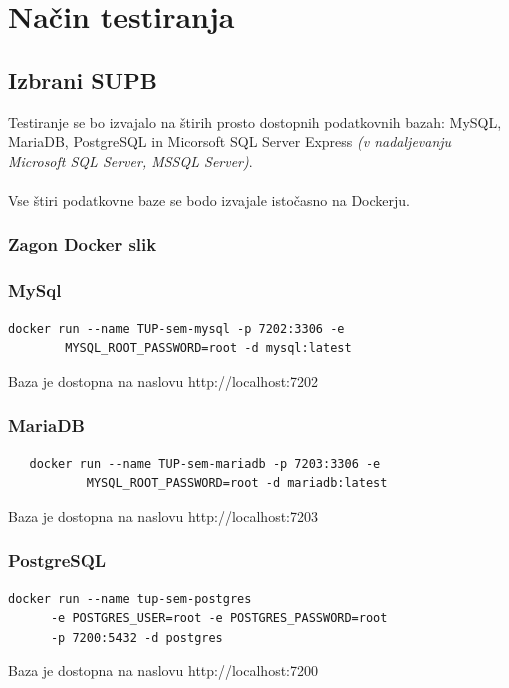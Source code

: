 \documentclass[a4paper,11pt]{report}
\begin{document}
\chapter{Način testiranja}
\section{Izbrani SUPB}
Testiranje se bo izvajalo na štirih prosto dostopnih podatkovnih bazah: MySQL, MariaDB, PostgreSQL in Micorsoft SQL Server Express \textit{(v nadaljevanju Microsoft SQL Server, MSSQL Server)}.
\\\\
Vse štiri podatkovne baze se bodo izvajale istočasno na Dockerju.

\subsection{Zagon Docker slik}

\subsection{MySql}
\begin{lstlisting}
docker run --name TUP-sem-mysql -p 7202:3306 -e 
        MYSQL_ROOT_PASSWORD=root -d mysql:latest
\end{lstlisting}

Baza je dostopna na naslovu http://localhost:7202

\subsection{MariaDB}
\begin{lstlisting}
   docker run --name TUP-sem-mariadb -p 7203:3306 -e 
           MYSQL_ROOT_PASSWORD=root -d mariadb:latest
   \end{lstlisting}
   
   Baza je dostopna na naslovu http://localhost:7203

\subsection{PostgreSQL}
\begin{lstlisting}
docker run --name tup-sem-postgres 
      -e POSTGRES_USER=root -e POSTGRES_PASSWORD=root 
      -p 7200:5432 -d postgres
\end{lstlisting}
   
Baza je dostopna na naslovu http://localhost:7200
\end{document}
